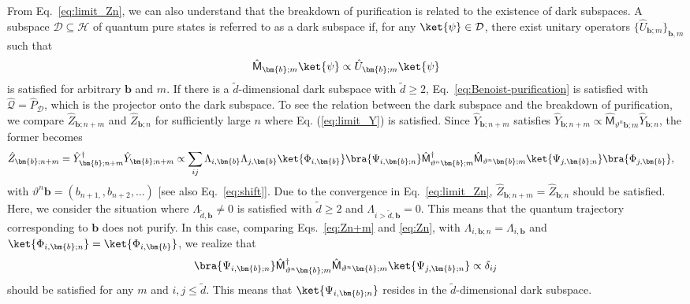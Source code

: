 \documentclass[preprint,pteplogo]{ptephy_v2}%
\numberwithin{equation}{section}
\theoremstyle{definition}
\newcommand{\mc}[1]{\mathcal{#1}}
\begin{document}
From Eq.~\eqref{eq:limit_Zn}, we can also understand that the breakdown of purification is related to the existence of dark subspaces. 
A subspace $\mathcal{D} \subseteq \mc{H}$ of quantum pure states is referred to as a dark subspace if, for any $\ket{\psi}\in\mathcal{D}$, there exist unitary operators $\{\hat{U}_{\bm{b};m}\}_{\bm{b},m}$ such that 
\begin{align}
    \hat{\mathsf{M}}_{\bm{b};m}\ket{\psi}\propto\hat{U}_{\bm{b};m}\ket{\psi}
\end{align}
is satisfied for arbitrary $\bm{b}$ and $m$. 
If there is a $\tilde{d}$-dimensional dark subspace with $\tilde{d}\geq2$,  Eq.~\eqref{eq:Benoist-purification} is satisfied with $\hat{\mathcal{Q}}=\hat{P}_\mathcal{D}$, which is the projector onto the dark subspace. 
To see the relation between the dark subspace and the breakdown of purification, we compare $\hat{Z}_{\bm{b};n+m}$ and $\hat{Z}_{\bm{b};n}$ for sufficiently large $n$ where Eq. (\ref{eq:limit_Y}) is satisfied. 
Since $\hat{Y}_{\bm{b};n+m}$ satisfies $\hat{Y}_{\bm{b};n+m}\propto\hat{\mathsf{M}}_{\vartheta^n\bm{b};m}\hat{Y}_{\bm{b};n}$, the former becomes
\begin{align}
    \hat{Z}_{\bm{b};n+m}=\hat{Y}_{\bm{b};n+m}^\dagger\hat{Y}_{\bm{b};n+m}&\propto\sum_{ij}\Lambda_{i,\bm{b}}\Lambda_{j,\bm{b}}\ket{\Phi_{i,\bm{b}}}\bra{\Psi_{i,\bm{b};n}}\hat{\mathsf{M}}_{\vartheta^n\bm{b};m}^\dagger\hat{\mathsf{M}}_{\vartheta^n\bm{b};m}\ket{\Psi_{j,\bm{b};n}}\bra{\Phi_{j,\bm{b}}},
    \label{eq:Zn+m}
\end{align}
with $\vartheta^n\bm{b}=(b_{n+1,},b_{n+2},\ldots)$ [see also Eq.~\eqref{eq:shift}]. 
Due to the convergence in Eq.~\eqref{eq:limit_Zn}, $\hat{Z}_{\bm{b};n+m}=\hat{Z}_{\bm{b};n}$ should be satisfied. 
Here, we consider the situation where $\Lambda_{\tilde{d},\bm{b}}\neq0$ is satisfied with $\tilde{d}\geq2$ and $\Lambda_{i>\tilde{d},\bm{b}}=0$.
This means that the quantum trajectory corresponding to $\bm{b}$ does not purify. 
In this case, comparing Eqs.~\eqref{eq:Zn+m} and \eqref{eq:Zn}, with $\Lambda_{i,\bm{b};n}=\Lambda_{i,\bm{b}}$ and $\ket{\Phi_{i,\bm{b};n}}=\ket{\Phi_{i,\bm{b}}}$, we realize that 
\begin{align}
\bra{\Psi_{i,\bm{b};n}}\hat{\mathsf{M}}_{\vartheta^n\bm{b};m}^\dagger\hat{\mathsf{M}}_{\vartheta^n\bm{b};m}\ket{\Psi_{j,\bm{b};n}}\propto\delta_{ij}
\end{align}
should be satisfied for any $m$ and $i,j\leq\tilde{d}$. 
This means that $\ket{\Psi_{i,\bm{b};n}}$ resides in the $\tilde{d}$-dimensional dark subspace.  
\end{document}
